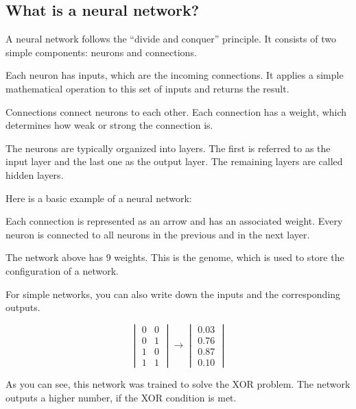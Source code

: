 \subsection{What is a neural network?}

A neural network follows the “divide and conquer” principle. It consists of two simple components: neurons and connections.

Each neuron has inputs, which are the incoming connections. It applies a simple mathematical operation to this set of inputs and returns the result.

Connections connect neurons to each other. Each connection has a weight, which determines how weak or strong the connection is.

The neurons are typically organized into layers. The first is referred to as the input layer and the last one as the output layer. The remaining layers are called hidden layers. \cite{Anderson1995}

Here is a basic example of a neural network:

{\centering
	\begin{neuralnetwork}[height=3, nodespacing=1.5cm]
		\newcommand{\nodelabel}[2]{
			\ifnum#1=0 $x_#2$ \fi
			\ifnum#1=1 $y_#2$ \fi
			\ifnum#1=2 $z_#2$ \fi
		}
		\setdefaultnodetext{\nodelabel}
		\hiddenlayer[count=3, bias=false, title=Hidden] \linklayers
		\outputlayer[count=1, title=Output] \linklayers
	\end{neuralnetwork}
\par}

Each connection is represented as an arrow and has an associated weight. Every neuron is connected to all neurons in the previous and in the next layer.

The network above has 9 weights. This is the genome, which is used to store the configuration of a network. \cite{Stanley2002}

For simple networks, you can also write down the inputs and the corresponding outputs.

\[
	\begin{vmatrix} 0 & 0 \\ 0 & 1 \\ 1 & 0 \\ 1 & 1 \end{vmatrix}
	\rightarrow
	\begin{vmatrix} 0.03 \\ 0.76 \\ 0.87 \\ 0.10 \end{vmatrix}	
\]

As you can see, this network was trained to solve the XOR problem. The network outputs a higher number, if the XOR condition is met.
